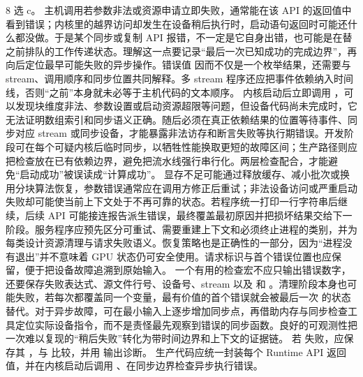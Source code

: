 \begin{solutionexercise}{8}
\conclusionheading 选 c。
\discussionheading
{}
主机调用若参数非法或资源申请立即失败，通常能在该 API 的返回值中看到错误；内核里的越界访问却发生在设备稍后执行时，启动语句返回时可能还什么都没做。于是某个同步或复制 API 报错，不一定是它自身出错，也可能是在替之前排队的工作传递状态。理解这一点要记录“最后一次已知成功的完成边界”，再向后定位最早可能失败的异步操作。错误值  因而不仅是一个枚举结果，还需要与 stream、调用顺序和同步位置共同解释。多 stream 程序还应把事件依赖纳入时间线，否则“之前”本身就未必等于主机代码的文本顺序。
内核启动后立即调用 ，可以发现块维度非法、参数设置或启动资源超限等问题，但设备代码尚未完成时，它无法证明数组索引和同步语义正确。随后必须在真正依赖结果的位置等待事件、同步对应 stream 或同步设备，才能暴露非法访存和断言失败等执行期错误。开发阶段可在每个可疑内核后临时同步，以牺牲性能换取更短的故障区间；生产路径则应把检查放在已有依赖边界，避免把流水线强行串行化。两层检查配合，才能避免“启动成功”被误读成“计算成功”。
显存不足可能通过释放缓存、减小批次或换用分块算法恢复，参数错误通常应在调用方修正后重试；非法设备访问或严重启动失败却可能使当前上下文处于不再可靠的状态。若程序统一打印一行字符串后继续，后续 API 可能接连报告派生错误，最终覆盖最初原因并把损坏结果交给下一阶段。服务程序应预先区分可重试、需要重建上下文和必须终止进程的类别，并为每类设计资源清理与请求失败语义。恢复策略也是正确性的一部分，因为“进程没有退出”并不意味着 GPU 状态仍可安全使用。请求标识与首个错误位置也应保留，便于把设备故障追溯到原始输入。
一个有用的检查宏不应只输出错误数字，还要保存失败表达式、源文件行号、设备号、stream 以及  和 。清理阶段本身也可能失败，若每次都覆盖同一个变量，最有价值的首个错误就会被最后一次  的状态替代。对于异步故障，可在最小输入上逐步增加同步点，再借助内存与同步检查工具定位实际设备指令，而不是责怪最先观察到错误的同步函数。良好的可观测性把一次难以复现的“稍后失败”转化为带时间边界和上下文的证据链。
\variantheading 若  失败，应保存其 ，与  比较，并用  输出诊断。
\practiceheading 生产代码应统一封装每个 Runtime API 返回值，并在内核启动后调用 、在同步边界检查异步执行错误。
\end{solutionexercise}

